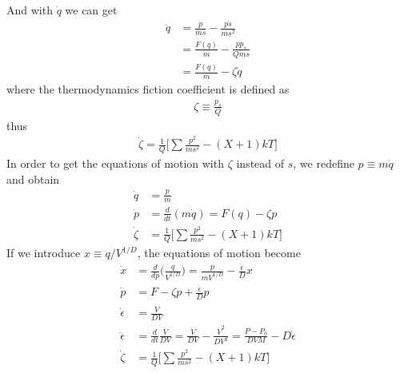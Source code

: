 \documentclass{article}
\begin{document}
And with $\dot{q}$ we can get
\begin{align}
\ddot{q}&=\frac{\dot{p}}{ms}-\frac{p\dot{s}}{ms^2}\nonumber\\
&=\frac{F(q)}{m}-\frac{pp_s}{Qms}\nonumber\\
&= \frac{F(q)}{m}-\zeta\dot{q}
\end{align}
where the thermodynamics fiction coefficient is defined as
\begin{align}
\zeta\equiv\frac{p_s}{Q}
\end{align}
thus
\begin{align}
\dot{\zeta}=\frac{1}{Q}\big[\sum\frac{p^2}{ms^2}-(X+1)kT\big]
\end{align}
In order to get the equations of motion with $\zeta$ instead of $s$, we redefine $p\equiv m\dot{q}$ and obtain
\begin{align}
\dot{q}&=\frac{p}{m}\nonumber\\
\dot{p}&=\frac{d}{dt}(m\dot{q})=F(q)-\zeta p\\
\dot{\zeta}&=\frac{1}{Q}\big[\sum\frac{p^2}{ms^2}-(X+1)kT\big]\nonumber
\end{align}
If we introduce $x\equiv q/V^{1/D}$, the equations of motion become
\begin{align}
\dot{x}&=\frac{d}{dp}\big(\frac{q}{V^{1/D}}\big)=\frac{p}{mV^{1/D}}-\frac{\dot{\epsilon}}{D}x\nonumber\\
\dot{p}&=F-\zeta p+\frac{\dot{\epsilon}}{D}p\nonumber\\
\dot{\epsilon}&=\frac{\dot{V}}{DV}\\
\ddot{\epsilon}&=\frac{d}{dt}\frac{\dot{V}}{DV}=\frac{\ddot{V}}{DV}-\frac{\dot{V}^2}{DV^2}=\frac{P-P_0}{DVM}-D\dot{\epsilon}\nonumber\\
\dot{\zeta}&=\frac{1}{Q}\big[\sum\frac{p^2}{ms^2}-(X+1)kT\big]\nonumber
\end{align}
\end{document}
